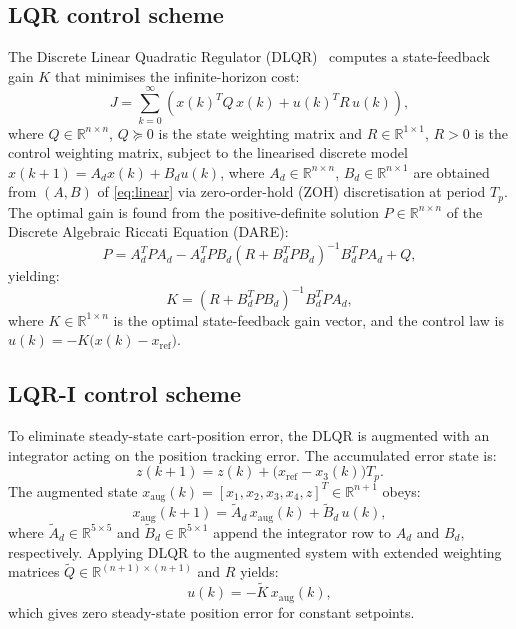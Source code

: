 \documentclass[twocolumn]{svjour3}
\begin{document}
\subsection{LQR control scheme}
The Discrete Linear Quadratic Regulator (DLQR)~\cite{Jezierski2017} computes a
state-feedback gain $K$ that minimises the infinite-horizon cost:
\begin{equation}
J = \sum_{k=0}^{\infty}\!\left(x(k)^T Q\,x(k) + u(k)^T R\,u(k)\right),
\label{eq:lqr_cost}
\end{equation}
where $Q\in\mathbb{R}^{n\times n}$, $Q\succeq 0$ is the state weighting matrix and
$R\in\mathbb{R}^{1\times 1}$, $R>0$ is the control weighting matrix,
subject to the linearised discrete model $x(k{+}1)=A_dx(k)+B_du(k)$,
where $A_d\in\mathbb{R}^{n\times n}$, $B_d\in\mathbb{R}^{n\times 1}$ are obtained from
$(A,B)$ of \eqref{eq:linear} via zero-order-hold (ZOH)
discretisation at period $T_p$. The optimal gain is found from the positive-definite solution $P\in\mathbb{R}^{n\times n}$ of the Discrete Algebraic
Riccati Equation (DARE):
\begin{equation}
P = A_d^T P A_d - A_d^T P B_d(R+B_d^T P B_d)^{-1}B_d^T P A_d + Q,
\end{equation}
yielding:
\begin{equation}
K = (R + B_d^T P B_d)^{-1}B_d^T P A_d,
\end{equation}
where $K\in\mathbb{R}^{1\times n}$ is the optimal state-feedback gain vector, and the control
law is $u(k) = -K\bigl(x(k) - x_\mathrm{ref}\bigr)$.

\subsection{LQR-I control scheme}

To eliminate steady-state cart-position error, the DLQR is augmented with an integrator
acting on the position tracking error. The accumulated error state is:
\begin{equation}
z(k+1) = z(k) + \bigl(x_\mathrm{ref} - x_3(k)\bigr)T_p.
\end{equation}
The augmented state $x_\mathrm{aug}(k)=[x_1,x_2,x_3,x_4,z]^T\in\mathbb{R}^{n+1}$ obeys:
\begin{equation}
x_\mathrm{aug}(k{+}1) = \tilde{A}_d\,x_\mathrm{aug}(k) + \tilde{B}_d\,u(k),
\end{equation}
where $\tilde{A}_d\in\mathbb{R}^{5\times 5}$ and $\tilde{B}_d\in\mathbb{R}^{5\times 1}$
append the integrator row to $A_d$ and $B_d$, respectively. Applying DLQR to the augmented
system with extended weighting matrices $\tilde{Q}\in\mathbb{R}^{(n+1)\times(n+1)}$ and $R$ yields:
\begin{equation}
u(k) = -\tilde{K}\,x_\mathrm{aug}(k),
\end{equation}
which gives zero steady-state position error for constant setpoints.
\end{document}
